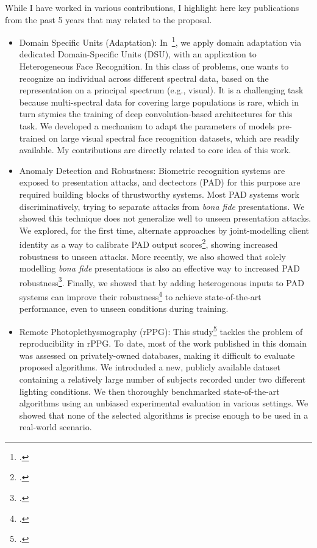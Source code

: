 \documentclass[a4paper,10pt,onecolumn]{article}
\begin{document}
While I have worked in various contributions, I highlight here key publications
from the past 5 years that may related to the proposal.

\begin{itemize}

    \item Domain Specific Units (Adaptation): In~\footcite{tifs-2019}, we apply
        domain adaptation via dedicated Domain-Specific Units (DSU), with an
        application to Heterogeneous Face Recognition.  In this class of
        problems, one wants to recognize an individual across different
        spectral data,  based on the representation on a principal spectrum
        (e.g., visual).  It is a challenging task because multi-spectral data
        for covering large populations is rare, which in turn stymies the
        training of deep convolution-based architectures for this task.  We
        developed a mechanism to adapt the parameters of models pre-trained on
        large visual spectral face recognition datasets, which are readily
        available.  My contributions are directly related to core idea of this
        work.

  \item Anomaly Detection and Robustness: Biometric recognition systems are
      exposed to presentation attacks, and dectectors (PAD) for this purpose
      are required building blocks of thrustworthy systems.  Most PAD systems
      work discriminatively, trying to separate attacks from \textit{bona fide}
      presentations.  We showed this technique does not generalize well to
      unseen presentation attacks.  We explored, for the first time, alternate
      approaches by joint-modelling client identity as a way to calibrate PAD
      output scores\footcite{tifs-2015}, showing increased robustness to unseen
      attacks.  More recently, we also showed that solely modelling
      \textit{bona fide} presentations is also an effective way to increased
      PAD robustness\footcite{icb-2018}.  Finally, we showed that by adding
      heterogenous inputs to PAD systems can improve their
      robustness\footcite{tifs-2019-2} to achieve state-of-the-art performance,
      even to unseen conditions during training.

  \item Remote Photoplethysmography (rPPG):  This study\footcite{arxiv-2017-2}
      tackles the problem of reproducibility in rPPG. To date, most of the work
      published in this domain was assessed on privately-owned databases,
      making it difficult to evaluate proposed algorithms.   We introduded a
      new, publicly available dataset containing a relatively large number of
      subjects recorded under two different lighting conditions.  We then
      thoroughly benchmarked state-of-the-art algorithms using an unbiased
      experimental evaluation in various settings.  We showed that none of the
      selected algorithms is precise enough to be used in a real-world
      scenario.

\end{itemize}
\end{document}
